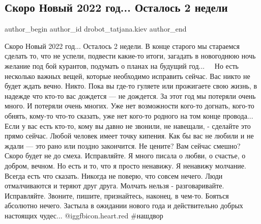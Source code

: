  
 
 
 
 
 
\subsection{Скоро Новый 2022 год... Осталось 2 недели}
\label{sec:15_12_2021.fb.drobot_tatjana.kiev.1.novyj_god_2022}
 
\ifcmt
 author_begin
   author_id drobot_tatjana.kiev
 author_end
\fi


\obeycr
Скоро Новый 2022 год...
Осталось 2 недели.
\smallskip
В конце старого мы стараемся сделать то, что не успели, подвести какие-то
итоги, загадать в новогоднюю ночь желание под бой курантов, подумать о планах
на будущий год... ⠀ Но есть несколько важных вещей, которые необходимо исправить
сейчас.
\smallskip
Вас никто не будет ждать вечно. Никто.
Пока вы где-то гуляете или прожигаете свою жизнь, в надежде что кто-то вас дождется — не дождется.
За этот год мы потеряли очень много.
\smallskip
И потеряли очень многих.
\smallskip
Уже нет возможности кого-то догнать, кого-то обнять, кому-то что-то сказать,
уже нет кого-то родного на том конце провода...
\smallskip
Если у вас есть кто-то, кому вы давно не звонили, не навещали, - сделайте это прямо сейчас.
\smallskip
Любой человек имеет точку кипения.
Как бы вас не любили и не ждали — это рано или поздно закончится.
Не цените? Вам сейчас смешно?
Скоро будет не до смеха. Исправляйте.
\smallskip
Я много писала о любви, о счастье, о добром, вечном.
\smallskip
Но есть и то, что я просто ненавижу.
Я ненавижу молчание.
Всегда есть что сказать.
Никогда не поверю, что совсем нечего.
Люди отмалчиваются и теряют друг друга.
Молчать нельзя - разговаривайте.
Исправляйте.
Звоните, пишите, признайтесь, наконец, в чем-то. 
Бояться абсолютно нечего.
\smallskip
Застыла в ожидании нового года и действительно добрых настоящих чудес... @igg{fbicon.heart.red}
\smallskip
\#нашдвор
\restorecr
